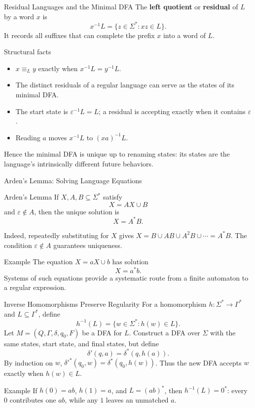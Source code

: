 \documentclass[10pt]{beamer}
\begin{document}
\begin{frame}{Residual Languages and the Minimal DFA}
  \small
  The \textbf{left quotient} or \textbf{residual} of $L$ by a word $x$ is
  \[
    x^{-1}L=\{z\in\Sigma^*:xz\in L\}.
  \]
  It records all suffixes that can complete the prefix $x$ into a word of
  $L$.
  \pause
  \begin{block}{Structural facts}
    \begin{itemize}
      \item $x\equiv_L y$ exactly when $x^{-1}L=y^{-1}L$.
      \item The distinct residuals of a regular language can serve as the
        states of its minimal DFA.
      \item The start state is $\varepsilon^{-1}L=L$; a residual is accepting
        exactly when it contains $\varepsilon$.
      \item Reading $a$ moves $x^{-1}L$ to $(xa)^{-1}L$.
    \end{itemize}
  \end{block}
  Hence the minimal DFA is unique up to renaming states: its states are the
  language's intrinsically different future behaviors.
\end{frame}

\begin{frame}{Arden's Lemma: Solving Language Equations}
  \small
  \begin{block}{Arden's Lemma}
    If $X,A,B\subseteq\Sigma^*$ satisfy
    \[
      X=AX\cup B
    \]
    and $\varepsilon\notin A$, then the unique solution is
    \[
      X=A^*B.
    \]
  \end{block}
  \pause
  Indeed, repeatedly substituting for $X$ gives
  $X=B\cup AB\cup A^2B\cup\cdots=A^*B$. The condition
  $\varepsilon\notin A$ guarantees uniqueness.
  \pause
  \begin{exampleblock}{Example}
    The equation $X=aX\cup b$ has solution
    \[
      X=a^*b.
    \]
    Systems of such equations provide a systematic route from a finite
    automaton to a regular expression.
  \end{exampleblock}
\end{frame}

\begin{frame}{Inverse Homomorphisms Preserve Regularity}
  \small
  For a homomorphism $h:\Sigma^*\to\Gamma^*$ and
  $L\subseteq\Gamma^*$, define
  \[
    h^{-1}(L)=\{w\in\Sigma^*:h(w)\in L\}.
  \]
  \pause
  Let $M=(Q,\Gamma,\delta,q_0,F)$ be a DFA for $L$. Construct a DFA over
  $\Sigma$ with the same states, start state, and final states, but define
  \[
    \delta'(q,a)=\delta^*(q,h(a)).
  \]
  By induction on $w$,
  $\delta'^*(q_0,w)=\delta^*(q_0,h(w))$. Thus the new DFA accepts $w$
  exactly when $h(w)\in L$.
  \pause
  \begin{exampleblock}{Example}
    If $h(0)=ab$, $h(1)=a$, and $L=(ab)^*$, then
    $h^{-1}(L)=0^*$: every $0$ contributes one $ab$, while any $1$ leaves an
    unmatched $a$.
  \end{exampleblock}
\end{frame}
\end{document}
